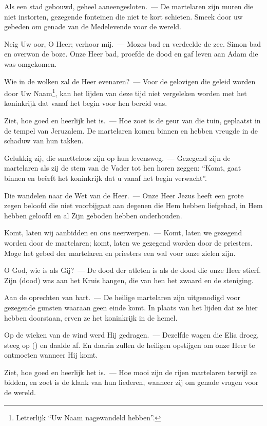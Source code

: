 \documentclass[12pt,twoside,a5paper]{article}
\begin{document}
\begin{halfparskip}
  Als een stad gebouwd, geheel aaneengesloten.~--- De martelaren zijn muren die niet instorten, gezegende fonteinen die niet te kort schieten. Smeek door uw gebeden om genade van de Medelevende voor de wereld.

  Neig Uw oor, O Heer; verhoor mij.~--- Mozes bad en verdeelde de zee. Simon bad en overwon de boze. Onze Heer bad, proefde de dood en gaf leven aan Adam die was omgekomen.

  Wie in de wolken zal de Heer evenaren?~--- Voor de gelovigen die geleid worden door Uw Naam\footnote{Letterlijk ``Uw Naam nagewandeld hebben''.}, kan het lijden van deze tijd niet vergeleken worden met het koninkrijk dat vanaf het begin voor hen bereid was.

  Ziet, hoe goed en heerlijk het is.~--- Hoe zoet is de geur van die tuin, geplaatst in de tempel van Jeruzalem. De martelaren komen binnen en hebben vreugde in de schaduw van hun takken.

  Gelukkig zij, die smetteloos zijn op hun levensweg.~--- Gezegend zijn de martelaren als zij de stem van de Vader tot hen horen zeggen: ``Komt, gaat binnen en beërft het koninkrijk dat u vanaf het begin verwacht''.

  Die wandelen naar de Wet van de Heer.~--- Onze Heer Jezus heeft een grote zegen beloofd die niet voorbijgaat aan degenen die Hem hebben liefgehad, in Hem hebben geloofd en al Zijn geboden hebben onderhouden.

  Komt, laten wij aanbidden en ons neerwerpen.~--- Komt, laten we gezegend worden door de martelaren; komt, laten we gezegend worden door de priesters. Moge het gebed der martelaren en priesters een wal voor onze zielen zijn.

  O God, wie is als Gij?~--- De dood der atleten is als de dood die onze Heer stierf. Zijn (dood) was aan het Kruis hangen, die van hen het zwaard en de steniging.

  Aan de oprechten van hart.~--- De heilige martelaren zijn uitgenodigd voor gezegende gunsten waaraan geen einde komt. In plaats van het lijden dat ze hier hebben doorstaan, erven ze het koninkrijk in de hemel.

  Op de wieken van de wind werd Hij gedragen.~--- Dezelfde wagen die Elia droeg, steeg op () en daalde af. En daarin zullen de heiligen opstijgen om onze Heer te ontmoeten wanneer Hij komt.

  Ziet, hoe goed en heerlijk het is.~--- Hoe mooi zijn de rijen martelaren terwijl ze bidden, en zoet is de klank van hun liederen, wanneer zij om genade vragen voor de wereld.


\end{halfparskip}
\end{document}
